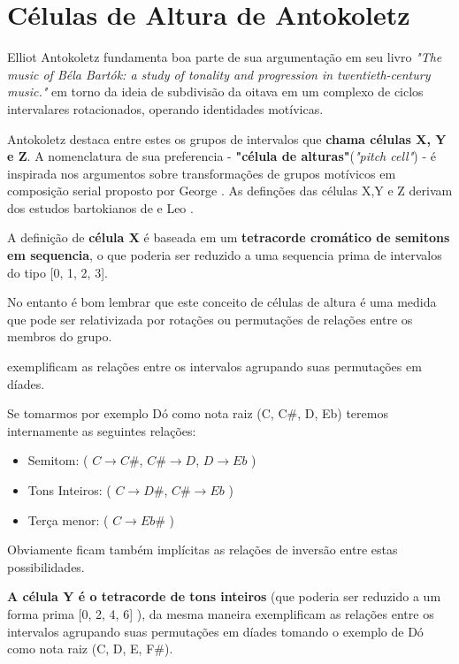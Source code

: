 \documentclass[
	12pt,				%
	openright,			%
	twoside,			%
	a4paper,			%
	english,			%
	french,				%
	spanish,			%
	brazil				%
	]{abntex2}
\begin{document}
\section{Células de Altura de Antokoletz}

Elliot Antokoletz fundamenta boa parte de sua argumentação em seu livro \textit{"The music of Béla Bartók: a study of tonality and progression in twentieth-century music."}\cite{antokoletz1984music} em torno da ideia de subdivisão da oitava em um complexo de ciclos intervalares rotacionados, operando identidades motívicas. 

Antokoletz destaca entre estes os grupos de intervalos que \textbf{chama células X, Y e Z}\cite[ p.69-77]{antokoletz1984music}. A nomenclatura de sua preferencia - \textbf{"célula de alturas"}(\textit{"pitch cell"}) - é inspirada nos argumentos sobre transformações de grupos motívicos em composição serial proposto por George . As definções das células X,Y e Z derivam dos estudos bartokianos de  e Leo .

A definição de \textbf{célula X } é baseada em um \textbf{tetracorde cromático de semitons em sequencia}, o que poderia ser reduzido a uma sequencia prima de intervalos do tipo [0, 1, 2, 3]. 

No entanto é bom lembrar que este conceito de células de altura é uma medida que pode ser relativizada por rotações ou permutações de relações entre os membros do grupo.

 exemplificam as relações entre os intervalos agrupando suas permutações em díades.

Se tomarmos por exemplo Dó como nota raiz (C, C\#, D, Eb) teremos internamente as seguintes relações:


\begin{itemize}
\item Semitom: ( $C \rightarrow C\#$, $C\# \rightarrow D$, $D \rightarrow Eb$ ) 

\item Tons Inteiros: ( $C \rightarrow D\#$, $C\# \rightarrow Eb$ )

\item Terça menor: ( $C \rightarrow Eb\#$ )
\end{itemize}

Obviamente ficam também implícitas as relações de inversão entre estas possibilidades.

\textbf{A célula Y é o tetracorde de tons inteiros} (que poderia ser reduzido a um forma prima [0, 2, 4, 6] ), da mesma maneira  exemplificam as relações entre os intervalos agrupando suas permutações em díades tomando o exemplo de Dó como nota raiz (C, D, E, F\#). 
\end{document}
